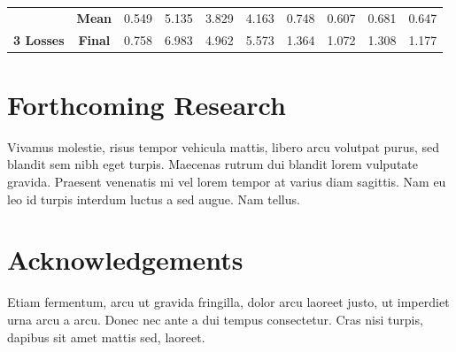 \documentclass[a0,portrait]{a0poster}
\begin{document}
\begin{multicols}{2}
\begin{table}[]
\begin{tabular}{cc|c|c|c|c|c|c|c|c|}
\multicolumn{1}{|c|}{}                                   & \textbf{Mean}  &0.549                 &5.135                 &3.829                 &4.163                & 0.748           & 0.607           & 0.681           & 0.647                                  \\ \cline{2-10} 
\multicolumn{1}{|c|}{\multirow{-2}{*}{\textbf{3 Losses}}} & \textbf{Final} &0.758                 &6.983                 &4.962                 &5.573                & 1.364           & 1.072            & 1.308           & 1.177                                  \\ \hline
\end{tabular}
\end{table}


\section*{Forthcoming Research}

Vivamus molestie, risus tempor vehicula mattis, libero arcu volutpat purus, sed blandit sem nibh eget turpis. Maecenas rutrum dui blandit lorem vulputate gravida. Praesent venenatis mi vel lorem tempor at varius diam sagittis. Nam eu leo id turpis interdum luctus a sed augue. Nam tellus.


\nocite{*} %


\section*{Acknowledgements}

Etiam fermentum, arcu ut gravida fringilla, dolor arcu laoreet justo, ut imperdiet urna arcu a arcu. Donec nec ante a dui tempus consectetur. Cras nisi turpis, dapibus sit amet mattis sed, laoreet.


\end{multicols}
\end{document}
